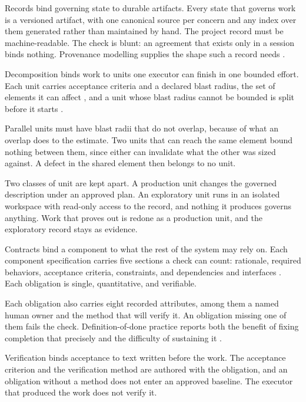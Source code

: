 Records bind governing state to durable artifacts. Every state that governs work is a versioned artifact, with one canonical source per concern and any index over them generated rather than maintained by hand. The project record must be machine-readable. The check is blunt: an agreement that exists only in a session binds nothing. Provenance modelling supplies the shape such a record needs \citep{provdm2013}.

Decomposition binds work to units one executor can finish in one bounded effort. Each unit carries acceptance criteria and a declared blast radius, the set of elements it can affect \citep{kretsou2021}, and a unit whose blast radius cannot be bounded is split before it starts \citep[Section~\hyperlink{nss-5.6}{5.6}]{pss2026}.

Parallel units must have blast radii that do not overlap, because of what an overlap does to the estimate. Two units that can reach the same element bound nothing between them, since either can invalidate what the other was sized against. A defect in the shared element then belongs to no unit.

Two classes of unit are kept apart. A production unit changes the governed description under an approved plan. An exploratory unit runs in an isolated workspace with read-only access to the record, and nothing it produces governs anything. Work that proves out is redone as a production unit, and the exploratory record stays as evidence.

Contracts bind a component to what the rest of the system may rely on. Each component specification carries five sections a check can count: rationale, required behaviors, acceptance criteria, constraints, and dependencies and interfaces \citep[Section~\hyperlink{nss-6.2}{6.2}]{pss2026}. Each obligation is single, quantitative, and verifiable.

Each obligation also carries eight recorded attributes, among them a named human owner and the method that will verify it. An obligation missing one of them fails the check. Definition-of-done practice reports both the benefit of fixing completion that precisely and the difficulty of sustaining it \citep{kopczynska2022}.

Verification binds acceptance to text written before the work. The acceptance criterion and the verification method are authored with the obligation, and an obligation without a method does not enter an approved baseline. The executor that produced the work does not verify it.

